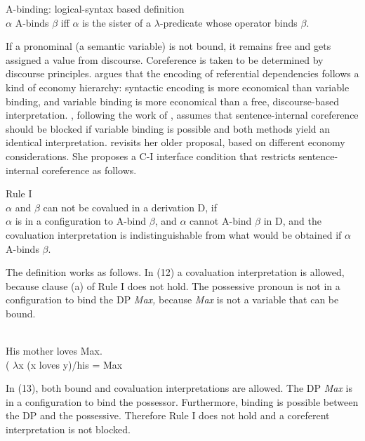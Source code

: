 \documentclass[output=paper]{langsci/langscibook}
\begin{document}
\ea%
    \label{ex:wein:10}
    A-binding: logical-syntax based definition \citep[171]{Reinhart2006}\\
    $\alpha $ A-binds $\beta $ iff $\alpha $ is the sister of a $\lambda $-predicate whose operator binds $\beta $.
\z

If a pronominal (a semantic variable) is not bound, it remains free and gets assigned a value from discourse. Coreference is taken to be determined by discourse principles. \citet{Reuland2011} argues that the encoding of referential dependencies follows a kind of economy hierarchy: syntactic encoding is more economical than variable binding, and variable binding is more economical than a free, discourse-based interpretation. \citet{Reuland2011}, following the work of \citet{Reinhart1983}, assumes that sentence-internal coreference should be blocked if variable binding is possible and both methods yield an identical interpretation. \citet{Reinhart2006} revisits her older proposal, based on different economy considerations. She proposes a C-I interface condition that restricts sentence-internal coreference as follows.

\ea%
    Rule I \citep[185]{Reinhart2006}\\
$\alpha $ and $\beta $ can not be covalued in a derivation D, if\\\label{ex:wein:11}
    \ea $\alpha $ is in a configuration to A-bind $\beta $, and
    \ex $\alpha $ cannot A-bind $\beta $ in D, and
    \ex the covaluation interpretation is indistinguishable from what would be obtained if $\alpha $ A-binds $\beta $.
    \z
\z

The definition works as follows. In (12) a covaluation interpretation is allowed, because clause (a) of Rule I does not hold. The possessive pronoun is not in a configuration to bind the DP \textit{Max,} because \textit{Max} is not a variable that can be bound.

\ea%
    \citep[186]{Reinhart2006}\\\label{ex:wein:12}
    His mother loves Max.\\ ( $\lambda $x (x loves y)\slash his = Max\\
\z

In (13), both bound and covaluation interpretations are allowed. The DP \textit{Max} is in a configuration to bind the possessor. Furthermore, binding is possible between the DP and the possessive. Therefore Rule I does not hold and a coreferent interpretation is not blocked.
\end{document}
